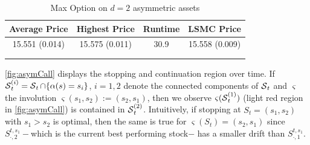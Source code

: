 \begin{table}[H]
\caption{Max Option on $d=2$ asymmetric assets}

\vspace{-2mm}
\label{tab:asymMaxOpt}
  \centering
  \begin{tabular}{ c c c c }
 \hline  \hline
    Average Price& Highest Price & Runtime & LSMC Price\\
  \hline \hline
15.551 (0.014)  & 15.575 (0.011) & 30.9 & 15.558 (0.009) \\
 \hline\\[-1em]
 
 \multicolumn{3}{l}{%
  \begin{minipage}{7.5cm}%
  \end{minipage}%
}
\end{tabular}
  \end{table}
  
\cref{fig:asymCall} displays the stopping and continuation
region over time. 
If  $\operatorname{\mathcal{S}}^{(i)}_t = \operatorname{\mathcal{S}}_t \cap \{\alpha(s) = s_i\}$, $i=1,2$ denote the connected components of $\operatorname{\mathcal{S}}_t$ and $\varsigma$ the involution   $\varsigma(s_1,s_2) := (s_2,s_1)$, then we observe $\varsigma(\operatorname{\mathcal{S}}^{(1)}_t)$ (light red region in \cref{fig:asymCall}) is contained in $\operatorname{\mathcal{S}}^{(2)}_t$. Intuitively, if stopping at $S_t = (s_1,s_2)$ with $s_1 > s_2$ is optimal, then the same is true for   $\varsigma(S_t)=(s_2,s_1)$ since $S^{t,s_1}_{\cdot,2}-$which is the current best performing stock$-$ has a smaller drift than $S^{t,s_1}_{\cdot,1}$. 


  
  


